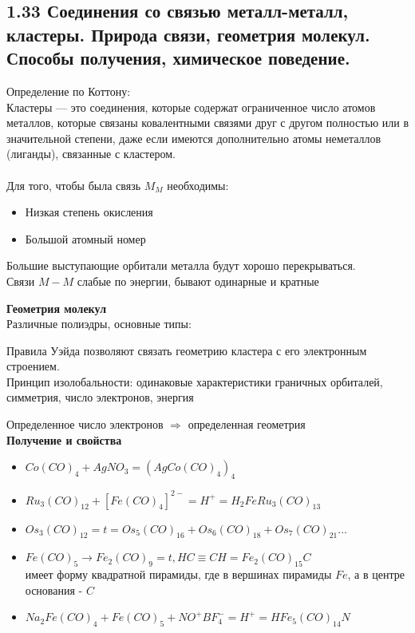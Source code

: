 
\subsection{1.33 Соединения со связью металл-металл, кластеры. Природа связи, геометрия молекул. Способы получения, химическое поведение.}
Определение по Коттону: \noindent \\
Кластеры — это соединения, которые содержат ограниченное число атомов металлов, которые связаны ковалентными связями друг с другом полностью или в значительной степени, даже если имеются дополнительно атомы неметаллов (лиганды), связанные с кластером. \\ \\
Для того, чтобы была связь $M_M$ необходимы:
\begin{itemize}
	\item Низкая степень окисления
	\item Большой атомный номер
\end{itemize}
Большие выступающие орбитали металла будут хорошо перекрываться. \\
Связи $M-M$ слабые по энергии, бывают одинарные и кратные\\
\begin{figure} [H]
	\centering {\texttt{[image: ff2]}}
\end{figure}
\textbf{Геометрия молекул}\\
Различные полиэдры, основные типы:
\begin{figure} [H]
	\centering {\texttt{[image: ff1]}}
\end{figure}
Правила Уэйда позволяют связать геометрию кластера с его электронным строением. \\
Принцип изолобальности: одинаковые характеристики граничных орбиталей, симметрия, число электронов, энергия \\
\begin{figure} [H]
	\centering {\texttt{[image: ff3]}}
\end{figure}
Определенное число электронов $\Rightarrow$ определенная геометрия \\
\textbf{Получение и свойства}
\begin{itemize}
	\item $Co(CO)_4 + AgNO_3 = (AgCo(CO)_4)_4 $
	\item $ Ru_3(CO)_{12} + \left[ Fe(CO)_4 \right]^{2-} = H^+ = H_2FeRu_3(CO)_{13} $
	\item $Os_3(CO)_{12} = t = Os_5(CO)_{16} + Os_6(CO)_{18} + Os_7(CO)_{21} ... $
	\item $ Fe(CO)_5 \rightarrow Fe_2(CO)_9 = t, HC\equiv CH = Fe_2(CO)_{15}C $ \\ имеет форму квадратной пирамиды, где в вершинах пирамиды $Fe$, а в центре основания - $C$
	\item $ Na_2Fe(CO)_4 + Fe(CO)_5 + NO^+BF_4^- = H^+ = HFe_5(CO)_{14}N $
	\begin{figure} [H]
		\centering {\texttt{[image: ff4]}}
	\end{figure}
\end{itemize}
